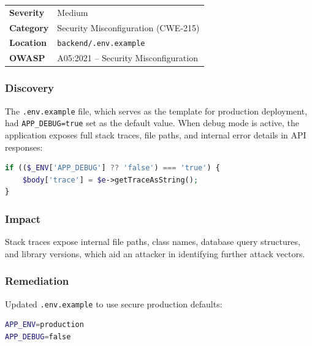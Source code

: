 \documentclass[12pt,a4paper]{article}
\begin{document}
\begin{table}[H]
\centering
\begin{tabularx}{\textwidth}{lX}
\toprule
\textbf{Severity} & \textcolor{medium}{Medium} \\
\textbf{Category} & Security Misconfiguration (CWE-215) \\
\textbf{Location} & \texttt{backend/.env.example} \\
\textbf{OWASP} & A05:2021 -- Security Misconfiguration \\
\bottomrule
\end{tabularx}
\end{table}

\subsubsection{Discovery}

The \texttt{.env.example} file, which serves as the template for production deployment, had \texttt{APP\_DEBUG=true} set as the default value. When debug mode is active, the application exposes full stack traces, file paths, and internal error details in API responses:

\begin{lstlisting}[language=PHP, caption={index.php -- Debug information leakage}]
if (($_ENV['APP_DEBUG'] ?? 'false') === 'true') {
    $body['trace'] = $e->getTraceAsString();
}
\end{lstlisting}

\subsubsection{Impact}

Stack traces expose internal file paths, class names, database query structures, and library versions, which aid an attacker in identifying further attack vectors.

\subsubsection{Remediation}

Updated \texttt{.env.example} to use secure production defaults:

\begin{lstlisting}[language=bash, caption={backend/.env.example -- Secure defaults}]
APP_ENV=production
APP_DEBUG=false
\end{lstlisting}

\end{document}
